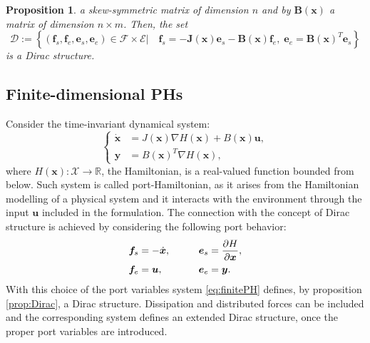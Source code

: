 \documentclass[preprint,12pt]{elsarticle}
\newtheorem{proposition}{Proposition}
\begin{document}
{\begin{proposition}
	 a skew-symmetric matrix of dimension $n$ and by $\bm{B}(\bm{x})$ a matrix of dimension $n \times m$. Then, the set
	\begin{equation}
	\mathcal{D} := \left\{ (\bm{f}_s, \bm{f}_e , \bm{e}_s ,\bm{e}_e ) \in \mathcal{F} \times \mathcal{E} \vert \quad \bm{f}_s = - \bm{J}(\bm{x}) \bm{e}_s - \bm{B}(\bm{x}) \bm{f}_e, \; \bm{e}_e = \bm{B}(\bm{x})^T \bm{e}_s \right\}
\end{equation}
is a Dirac structure.
\end{proposition}
\subsection{Finite-dimensional PHs}
Consider the time-invariant dynamical system:
\begin{equation}
\label{eq:finitePH}
\begin{cases}
\dot{ \bm{x} } &= J(\bm{x}) \nabla H(\bm{x}) + B(\bm{x})\bm{u}, \\
\bm{y} &= B(\bm{x})^T \nabla H(\bm{x}),
\end{cases}
\end{equation}
where $ H(\bm{x}) : \mathcal{X} \rightarrow \mathbb{R} $, the Hamiltonian, is a real-valued function bounded from below. Such system is called port-Hamiltonian, as it arises from the Hamiltonian modelling of a physical system and it interacts with the environment through the input $\bm{u}$ included in the formulation. The connection with the concept of Dirac structure is achieved by considering the following port behavior:
\begin{equation}
\begin{aligned}
\bm{f}_s &= - \dot{ \bm{x} }, \qquad 
&\bm{e}_s &= \diffp{H}{\bm{x}}, \\
\bm{f}_e &= \bm{u}, \qquad
&\bm{e}_e &= \bm{y}. \\
\end{aligned}
\end{equation}
With this choice of the port variables system \eqref{eq:finitePH} defines, by proposition \ref{prop:Dirac}, a Dirac structure. Dissipation and distributed forces can be included and the corresponding system defines an extended Dirac structure, once the proper port variables are introduced.
}
\end{document}
